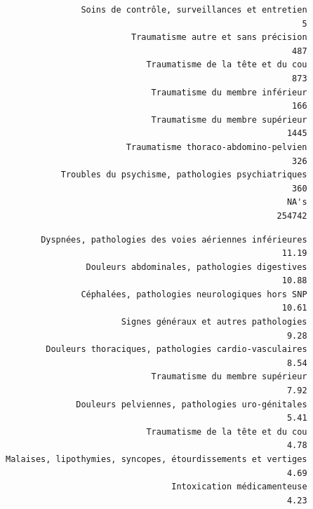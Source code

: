 \documentclass[]{article}
\newenvironment{Shaded}{\begin{snugshade}}{\end{snugshade}}
\newcommand{\KeywordTok}[1]{\textcolor[rgb]{0.13,0.29,0.53}{\textbf{{#1}}}}
\newcommand{\DataTypeTok}[1]{\textcolor[rgb]{0.13,0.29,0.53}{{#1}}}
\newcommand{\DecValTok}[1]{\textcolor[rgb]{0.00,0.00,0.81}{{#1}}}
\newcommand{\StringTok}[1]{\textcolor[rgb]{0.31,0.60,0.02}{{#1}}}
\newcommand{\CommentTok}[1]{\textcolor[rgb]{0.56,0.35,0.01}{\textit{{#1}}}}
\newcommand{\OtherTok}[1]{\textcolor[rgb]{0.56,0.35,0.01}{{#1}}}
\newcommand{\NormalTok}[1]{{#1}}
\begin{document}
\begin{verbatim}
               Soins de contrôle, surveillances et entretien 
                                                           5 
                         Traumatisme autre et sans précision 
                                                         487 
                            Traumatisme de la tête et du cou 
                                                         873 
                             Traumatisme du membre inférieur 
                                                         166 
                             Traumatisme du membre supérieur 
                                                        1445 
                        Traumatisme thoraco-abdomino-pelvien 
                                                         326 
           Troubles du psychisme, pathologies psychiatriques 
                                                         360 
                                                        NA's 
                                                      254742 
\end{verbatim}

\begin{Shaded}
\end{Shaded}

\begin{verbatim}
       Dyspnées, pathologies des voies aériennes inférieures 
                                                       11.19 
                Douleurs abdominales, pathologies digestives 
                                                       10.88 
               Céphalées, pathologies neurologiques hors SNP 
                                                       10.61 
                       Signes généraux et autres pathologies 
                                                        9.28 
        Douleurs thoraciques, pathologies cardio-vasculaires 
                                                        8.54 
                             Traumatisme du membre supérieur 
                                                        7.92 
              Douleurs pelviennes, pathologies uro-génitales 
                                                        5.41 
                            Traumatisme de la tête et du cou 
                                                        4.78 
Malaises, lipothymies, syncopes, étourdissements et vertiges 
                                                        4.69 
                                 Intoxication médicamenteuse 
                                                        4.23 
\end{verbatim}
\end{document}
